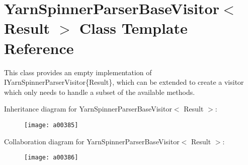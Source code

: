 \hypertarget{a00174}{\section{Yarn\-Spinner\-Parser\-Base\-Visitor$<$ Result $>$ Class Template Reference}
\label{a00174}
}


This class provides an empty implementation of I\-Yarn\-Spinner\-Parser\-Visitor\{\-Result\}, which can be extended to create a visitor which only needs to handle a subset of the available methods.  




Inheritance diagram for Yarn\-Spinner\-Parser\-Base\-Visitor$<$ Result $>$\-:
\nopagebreak
\begin{figure}[H]
\begin{center}
\leavevmode
\texttt{[image: a00385]}
\end{center}
\end{figure}


Collaboration diagram for Yarn\-Spinner\-Parser\-Base\-Visitor$<$ Result $>$\-:
\nopagebreak
\begin{figure}[H]
\begin{center}
\leavevmode
\texttt{[image: a00386]}
\end{center}
\end{figure}
